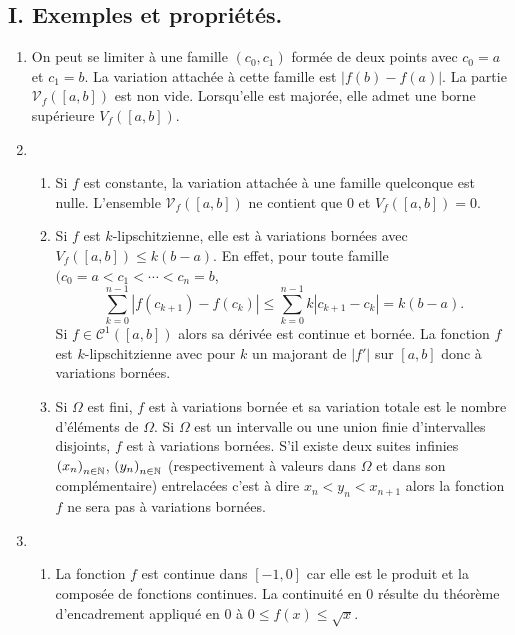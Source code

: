 \subsection*{I. Exemples et propriétés.}
\begin{enumerate}
  \item On peut se limiter à une famille $(c_0,c_1)$ formée de deux points avec $c_0=a$ et $c_1=b$. La variation attachée à cette famille est $|f(b)-f(a)|$. La partie $\mathcal{V}_f([a,b])$ est non vide. Lorsqu'elle est majorée, elle admet une borne supérieure $V_f([a,b])$.
  
  \item
\begin{enumerate}
  \item Si $f$ est constante, la variation attachée à une famille quelconque est nulle. L'ensemble $\mathcal{V}_f([a,b])$ ne contient que $0$ et $V_f([a,b])=0$.
  
  \item Si $f$ est $k$-lipschitzienne, elle est à variations bornées avec $V_f([a,b]) \leq k(b-a)$.
En effet, pour toute famille $(c_0=a < c_1 < \cdots < c_n = b$,
\begin{displaymath}
\sum_{k=0}^{n-1}|f(c_{k+1}) - f(c_k)| \leq \sum_{k=0}^{n-1}k|c_{k+1} - c_k| = k(b-a).
\end{displaymath}
Si $f \in \mathcal{C}^1([a,b])$ alors sa dérivée est continue et bornée. La fonction $f$ est $k$-lipschitzienne avec pour $k$ un majorant de $|f'|$ sur $[a,b]$ donc à variations bornées.
  \item Si $\Omega$ est fini, $f$ est à variations bornée et sa variation totale est le nombre d'éléments de $\Omega$. Si $\Omega$ est un intervalle ou une union finie d'intervalles disjoints, $f$ est à variations bornées.\newline
S'il existe deux suites infinies  $\left( x_n\right)_{n\in \mathbb{N}}$, $\left( y_n\right)_{n\in \mathbb{N}}$ (respectivement à valeurs dans $\Omega$ et dans son complémentaire) entrelacées c'est à dire $x_n < y_n < x_{n+1}$ alors la fonction $f$ ne sera pas à variations bornées.
\end{enumerate}

  \item
\begin{enumerate}
  \item La fonction $f$ est continue dans $[-1,0]$ car elle est le produit et la composée de fonctions continues. La continuité en $0$ résulte du théorème d'encadrement appliqué en $0$ à $0 \leq f(x) \leq \sqrt{x}$.


\end{enumerate}
\end{enumerate}
